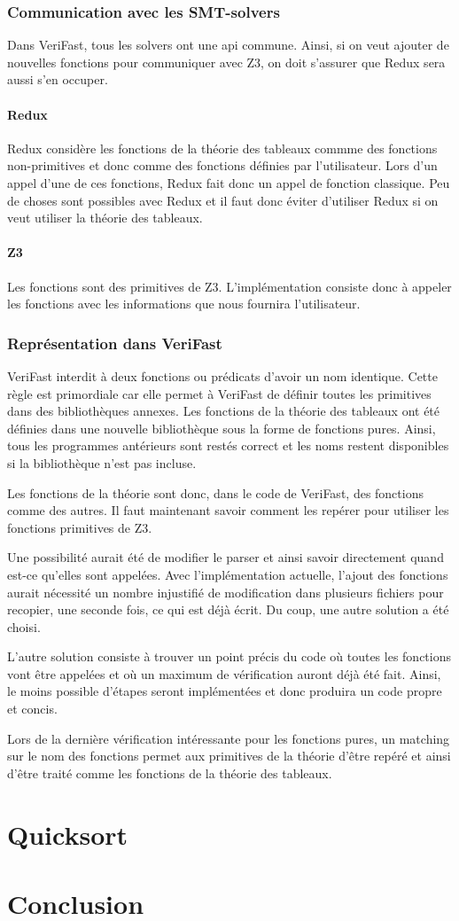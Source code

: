 \documentclass[9pt]{book}
\newcommand{\verifast}{VeriFast}
\begin{document}
		\subsection{Communication avec les SMT-solvers}
		Dans \verifast{}, tous les solvers ont une api commune. Ainsi, si on veut ajouter de nouvelles fonctions pour communiquer avec Z3, on doit s'assurer que Redux sera aussi s'en occuper.
			\subsubsection{Redux}
			Redux consid\`ere les fonctions de la th\'eorie des tableaux commme des fonctions non-primitives et donc comme des fonctions d\'efinies par l'utilisateur. Lors d'un appel d'une de ces fonctions, Redux fait donc un appel de fonction classique. Peu de choses sont possibles avec Redux et il faut donc \'eviter d'utiliser Redux si on veut utiliser la th\'eorie des tableaux.
			\subsubsection{Z3}
			Les fonctions sont des primitives de Z3. L'impl\'ementation consiste donc \`a appeler les fonctions avec les informations que nous fournira l'utilisateur.
		\subsection{Repr\'esentation dans \verifast{}}
		\verifast{} interdit \`a deux fonctions ou pr\'edicats d'avoir un nom identique. Cette r\`egle est primordiale car elle permet \`a \verifast{} de d\'efinir toutes les primitives dans des biblioth\`eques annexes. Les fonctions de la th\'eorie des tableaux ont \'et\'e d\'efinies dans une nouvelle biblioth\`eque sous la forme de fonctions pures. Ainsi, tous les programmes ant\'erieurs sont rest\'es correct et les noms restent disponibles si la biblioth\`eque n'est pas incluse.\par
		Les fonctions de la th\'eorie sont donc, dans le code de \verifast{}, des fonctions comme des autres. Il faut maintenant savoir comment les rep\'erer pour utiliser les fonctions primitives de Z3. \par
		Une possibilit\'e aurait \'et\'e de modifier le parser et ainsi savoir directement quand est-ce qu'elles sont appel\'ees. Avec l'impl\'ementation actuelle, l'ajout des fonctions aurait n\'ecessit\'e un nombre injustifi\'e de modification dans plusieurs fichiers pour recopier, une seconde fois, ce qui est d\'ej\`a \'ecrit. Du coup, une autre solution a \'et\'e choisi. \par
		L'autre solution consiste \`a trouver un point pr\'ecis du code o\`u toutes les fonctions vont \^etre appel\'ees et o\`u un maximum de v\'erification auront d\'ej\`a \'et\'e fait. Ainsi, le moins possible d'\'etapes seront impl\'ement\'ees et donc produira un code propre et concis.\par
		Lors de la derni\`ere v\'erification int\'eressante pour les fonctions pures, un matching sur le nom des fonctions permet aux primitives de la th\'eorie d'\^etre rep\'er\'e et ainsi d'\^etre trait\'e comme les fonctions de la th\'eorie des tableaux.

\chapter{Quicksort}
\chapter{Conclusion}
\tableofcontents
\end{document}
